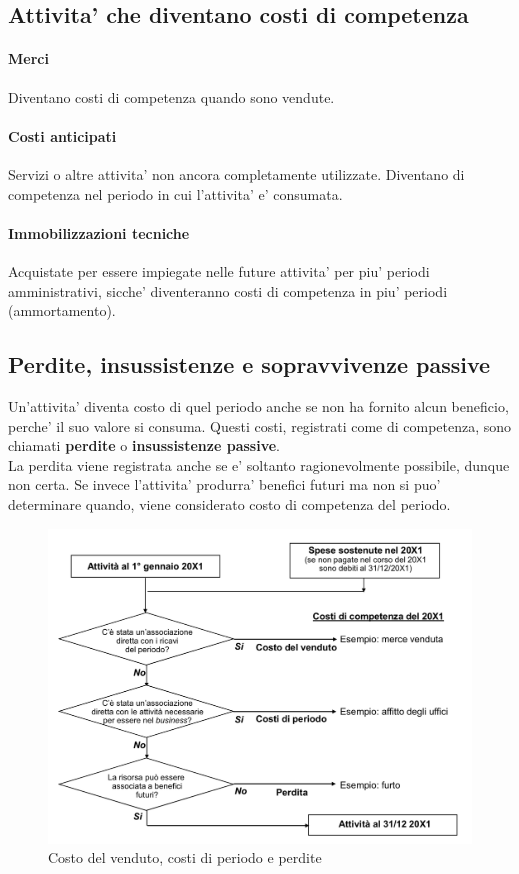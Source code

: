 \documentclass{report}
\begin{document}
	\subsection{Attivita' che diventano costi di competenza}
	\paragraph{Merci} Diventano costi di competenza quando sono vendute.
	\paragraph{Costi anticipati} Servizi o altre attivita' non ancora completamente utilizzate. Diventano di competenza nel periodo in cui l'attivita' e' consumata.
	\paragraph{Immobilizzazioni tecniche} Acquistate per essere impiegate nelle future attivita' per piu' periodi amministrativi, sicche' diventeranno costi di competenza in piu' periodi (ammortamento).
	\subsection{Perdite, insussistenze e sopravvivenze passive}
	Un'attivita' diventa costo di quel periodo anche se non ha fornito alcun beneficio, perche' il suo valore si consuma. Questi costi, registrati come di competenza, sono chiamati \textbf{perdite} o \textbf{insussistenze passive}.
	\medskip \\La perdita viene registrata anche se e' soltanto ragionevolmente possibile, dunque non certa. Se invece l'attivita' produrra' benefici futuri ma non si puo' determinare quando, viene considerato costo di competenza del periodo.
	\begin{figure}[h]
		\centering
		\includegraphics[width=0.7\linewidth]{sintesi-costi-perdite}
		\caption{Costo del venduto, costi di periodo e perdite}
		\label{fig:sintesi-costi-perdite}
	\end{figure}
	\newpage
\end{document}
